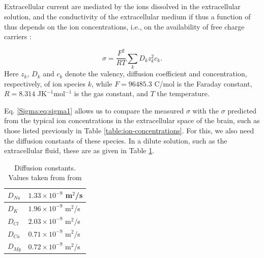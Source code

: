 \subsection{ }



\subsection{ }
\label{sec:Sigma:concentrationbased}

Extracellular current are mediated by the ions dissolved in the extracellular solution, and the conductivity of the extracellular medium if thus a function of thus depends on the ion concentrations, i.e., on the availability of free charge carriers \citep{Grodzinsky2011}: 

\begin{equation}
\sigma = \frac{F^2}{RT}\sum_{k} D_k z_{k}^2 c_{k}.
\label{Sigma:eq:sigma1}
\end{equation}
Here $z_{k}$, $D_k$ and $c_{k}$ denote the valency, diffusion coefficient and concentration, respectively, of ion species $k$, while $F = 96485.3$ C/mol is the Faraday constant, $R = 8.314$ JK$^{-1}$mol$^{-1}$ is the gas constant, and $T$ the temperature. 

Eq. \ref{Sigma:eq:sigma1} allows us to compare the measured $\sigma$ with the $\sigma$ predicted from the typical ion concentrations in the extracellular space of the brain, such as those listed previously in Table \ref{table:ion-concentrations}. For this, we also need the diffusion constants of these species. In a dilute solution, such as the extracellular fluid, these are as given in Table \ref{Sigma:tab:diffconsts}.

\begin{table}[h!]
\begin{center}
\caption{Diffusion constants. Values taken from from \citep{Bowen2002, Lyshevski2007}}
\label{Sigma:tab:diffconsts}
    \begin{tabular}{l|l}
    \hline
    $D_{Na}$ & $1.33\times 10^{-9}$ m$^2$/s\\ \hline
    $D_K$ & $1.96  \times 10^{-9}$ m$^2$/s \\ \hline
    $D_{Cl}$ & $2.03 \times 10^{-9}$ m$^2$/s \\ \hline
    $D_{Ca}$ & $0.71\times 10^{-9}$ m$^2$/s \\ \hline
    $D_{Mg}$ & $0.72\times 10^{-9}$ m$^2$/s \\ \hline    
    \end{tabular}
\end{center}
\end{table}

